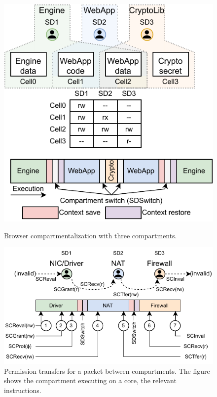 \begin{figure}
  \centering
  \includegraphics[width=0.75\linewidth]{media/seccells/browser_webapp.pdf}
  \caption{Browser compartmentalization with three compartments.}
  \label{fig:browser_eg}
  \includegraphics[width=\linewidth]{media/seccells/dataflow_app.pdf}
  \caption[Permission transfers for a packet between \seccells compartments.]
          {Permission transfers for a packet between \seccells compartments. 
            The figure shows the compartment executing on a core, the 
            relevant \seccells instructions.}
  \label{fig:dataflow_app}
\end{figure}

